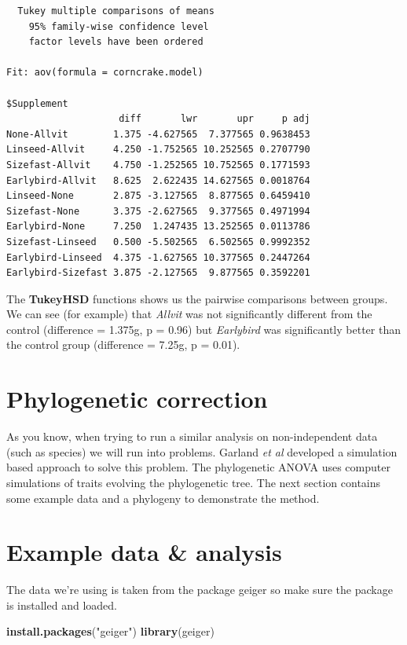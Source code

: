 \documentclass[
]{book}
\newenvironment{Shaded}{\begin{snugshade}}{\end{snugshade}}
\newcommand{\KeywordTok}[1]{\textcolor[rgb]{0.13,0.29,0.53}{\textbf{#1}}}
\newcommand{\NormalTok}[1]{#1}
\newcommand{\StringTok}[1]{\textcolor[rgb]{0.31,0.60,0.02}{#1}}
\begin{document}
\begin{verbatim}
  Tukey multiple comparisons of means
    95% family-wise confidence level
    factor levels have been ordered

Fit: aov(formula = corncrake.model)

$Supplement
                    diff       lwr       upr     p adj
None-Allvit        1.375 -4.627565  7.377565 0.9638453
Linseed-Allvit     4.250 -1.752565 10.252565 0.2707790
Sizefast-Allvit    4.750 -1.252565 10.752565 0.1771593
Earlybird-Allvit   8.625  2.622435 14.627565 0.0018764
Linseed-None       2.875 -3.127565  8.877565 0.6459410
Sizefast-None      3.375 -2.627565  9.377565 0.4971994
Earlybird-None     7.250  1.247435 13.252565 0.0113786
Sizefast-Linseed   0.500 -5.502565  6.502565 0.9992352
Earlybird-Linseed  4.375 -1.627565 10.377565 0.2447264
Earlybird-Sizefast 3.875 -2.127565  9.877565 0.3592201
\end{verbatim}

The \textbf{TukeyHSD} functions shows us the pairwise comparisons between groups. We can see (for example) that \emph{Allvit} was not significantly different from the control (difference = 1.375g, p = 0.96) but \emph{Earlybird} was significantly better than the control group (difference = 7.25g, p = 0.01).

\hypertarget{phylogenetic-correction}{%
\section{Phylogenetic correction}\label{phylogenetic-correction}}

As you know, when trying to run a similar analysis on non-independent data (such as species) we will run into problems. Garland \emph{et al} \citeyearpar{garland93} developed a simulation based approach to solve this problem. The phylogenetic ANOVA uses computer simulations of traits evolving the phylogenetic tree. The next section contains some example data and a phylogeny to demonstrate the method.

\hypertarget{example-data-analysis}{%
\section{Example data \& analysis}\label{example-data-analysis}}

The data we're using is taken from the package geiger \citep{geiger} so make sure the package is installed and loaded.

\begin{Shaded}
\begin{Highlighting}[]
\KeywordTok{install.packages}\NormalTok{(}\StringTok{"geiger"}\NormalTok{)}
\KeywordTok{library}\NormalTok{(geiger)}
\end{Highlighting}
\end{Shaded}
\end{document}
